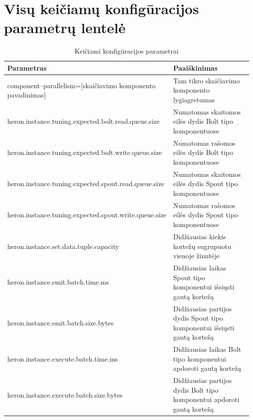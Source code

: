 \documentclass{VUMIFPSbakalaurinis}
\begin{document}
\section{Visų keičiamų konfigūracijos parametrų lentelė}
\begin{longtable}{|p{0.59\linewidth}|p{0.41\linewidth}|}
    \caption{Keičiami konfigūracijos parametrai}
    \label{param–table}\\
    \hline
    \rowcolor[HTML]{C0C0C0} 
    Parametras                                              & Paaiškinimas                                                                                 \\ \hline
    \endfirsthead
    \endhead
    component–parallelism=[skaičiavimo komponento pavadinimas]            & Tam tikro skaičiavimo komponento lygiagretumas                                 \\ \hline
    heron.instance.tuning.expected.bolt.read.queue.size                   & Numatomas skaitomos eilės dydis Bolt tipo komponentuose                        \\ \hline
    heron.instance.tuning.expected.bolt.write.queue.size                  & Numatomas rašomos eilės dydis Bolt tipo komponentuose                          \\ \hline
    heron.instance.tuning.expected.spout.read.queue.size                  & Numatomas skaitomos eilės dydis Spout tipo komponentuose                       \\ \hline
    heron.instance.tuning.expected.spout.write.queue.size                 & Numatomas rašomos eilės dydis Spout tipo komponentuose                         \\ \hline
    heron.instance.set.data.tuple.capacity                                & Didžiausias kiekis kortežų sugrupuotu vienoje žinutėje                        \\ \hline
    heron.instance.emit.batch.time.ms                                     & Didžiausias laikas Spout tipo komponentui išsiųsti gautą kortežą               \\ \hline
    heron.instance.emit.batch.size.bytes                                  & Didžiausias partijos dydis Spout tipo komponentui išsiųsti gautą kortežą       \\ \hline
    heron.instance.execute.batch.time.ms                                  & Didžiausias laikas Bolt tipo komponentui apdoroti gautą kortežą                \\ \hline
    heron.instance.execute.batch.size.bytes                               & Didžiausias partijos dydis Bolt tipo komponentui apdoroti gautą kortežą        \\ \hline

\end{longtable}
\end{document}

